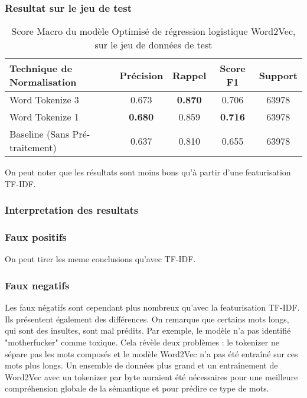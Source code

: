 \subsubsection{Resultat sur le jeu de test}
\begin{table}[ht]
    \centering
    \caption{Score Macro du modèle Optimisé de régression logistique Word2Vec, sur le jeu de données de test}
    \begin{tabular}{lcccc}
    \hline
    \textbf{Technique de Normalisation} & \textbf{Précision} & \textbf{Rappel} & \textbf{Score F1} & \textbf{Support} \\ \hline
    Word Tokenize 3                          & 0.673              & \textbf{0.870}           & 0.706            & 63978            \\\hline
    Word Tokenize 1                          & \textbf{0.680}              & 0.859           & \textbf{0.716}             & 63978            \\\hline
    Baseline (Sans Pré-traitement)           & 0.637              & 0.810           & 0.655             & 63978            \\ 
\end{tabular}
\label{tab:results}
\end{table}

On peut noter que les résultats sont moins bons qu'à partir d'une featurisation TF-IDF.

\subsubsection{Interpretation des resultats}
\subsubsection{Faux positifs}
On peut tirer les meme conclusions qu'avec TF-IDF. 

\subsubsection{Faux negatifs}
Les faux négatifs sont cependant plus nombreux qu'avec la featurisation TF-IDF. 
Ils présentent également des différences. 
On remarque que certains mots longs, qui sont des insultes, sont mal prédits. 
Par exemple, le modèle n'a pas identifié "motherfucker" comme toxique. 
Cela révèle deux problèmes : le tokenizer ne sépare pas les mots composés et le modèle Word2Vec n'a pas été entraîné sur ces mots plus longs. 
Un ensemble de données plus grand et un entraînement de Word2Vec avec un tokenizer par byte auraient été nécessaires pour une meilleure compréhension globale de la sémantique et pour prédire ce type de mots.

